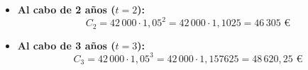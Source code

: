 \documentclass[a4paper,12pt]{article}
\begin{document}
\begin{enumerate}
\begin{itemize}
            \item \textbf{Al cabo de 2 años ($t = 2$):}
            \[
            C_2 = 42\,000 \cdot 1{,}05^2 = 42\,000 \cdot 1{,}1025 = 46\,305\text{ €}
            \]
            
            \item \textbf{Al cabo de 3 años ($t = 3$):}
            \[
            C_3 = 42\,000 \cdot 1{,}05^3 = 42\,000 \cdot 1{,}157625 = 48\,620{,}25\text{ €}
            \]
        \end{itemize}  
    
        
\end{enumerate}
\end{document}
